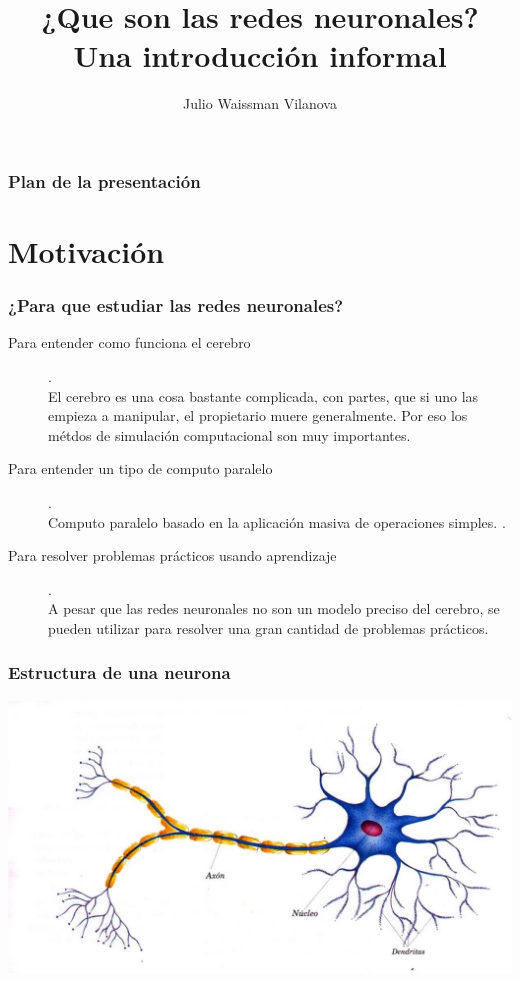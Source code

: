 \documentclass{beamer}
\title[Redes neuronales] %
{¿Que son las redes neuronales? \\Una introducción informal}
\author[Waissman]{Julio Waissman Vilanova}
\institute[Botón Rojo] %
{Departamento de Matem\'aticas\\
  \textbf{Universidad de Sonora}\\
  para \textbf{Botón Rojo}
}
\date{}
\begin{document}
\begin{frame}
  \titlepage
\end{frame}

\begin{frame}
  \frametitle{Plan de la presentación}
  \tableofcontents
\end{frame}

\section{Motivación}

\begin{frame}
  \frametitle{¿Para que estudiar las redes neuronales?}
  \begin{description}
  \item[Para entender como funciona el cerebro].\\
    El cerebro es una cosa bastante complicada, con partes, que si uno las
    empieza a manipular, el propietario muere generalmente. Por eso los
    métdos de simulación computacional son muy importantes.
    
  \item[Para entender un tipo de computo paralelo].\\  Computo paralelo
    basado en la aplicación masiva de operaciones simples. .
    
  \item[\alert{Para resolver problemas prácticos usando aprendizaje}].\\
    A pesar que las redes neuronales no son un modelo preciso del
    cerebro, se pueden utilizar para resolver una gran cantidad de
    problemas prácticos.
  \end{description}
  
\end{frame}

\begin{frame}
  \frametitle{Estructura de una neurona}
  \begin{center}
    \includegraphics[width=\textwidth]{neurona.jpg}
  \end{center}
\end{frame}
\end{document}
